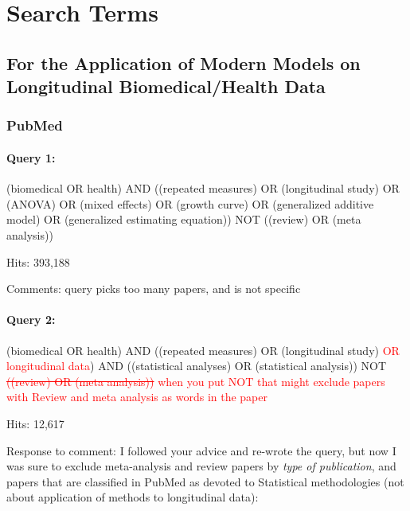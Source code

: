 \documentclass[
]{article}
\let\oldparagraph\paragraph
\renewcommand{\paragraph}[1]{\oldparagraph{#1}\mbox{}}
\newcommand{\BN}[1]{\textcolor{red}{#1}}
\begin{document}
\hypertarget{search-terms}{%
\section{Search Terms}\label{search-terms}}

\hypertarget{for-the-application-of-modern-models-on-longitudinal-biomedicalhealth-data}{%
\subsection{For the Application of Modern Models on Longitudinal
Biomedical/Health
Data}\label{for-the-application-of-modern-models-on-longitudinal-biomedicalhealth-data}}

\hypertarget{pubmed}{%
\subsubsection{PubMed}\label{pubmed}}

\hypertarget{query-1}{%
\paragraph{Query 1:}\label{query-1}}

(biomedical OR health) AND ((repeated measures) OR (longitudinal study)
OR (ANOVA) OR (mixed effects) OR (growth curve) OR (generalized additive
model) OR (generalized estimating equation)) NOT ((review) OR (meta
analysis))

Hits: 393,188

Comments: query picks too many papers, and is not specific

\hypertarget{query-2}{%
\paragraph{Query 2:}\label{query-2}}

(biomedical OR health) AND ((repeated measures) OR (longitudinal study)
\BN{OR longitudinal data}) AND ((statistical analyses) OR (statistical
analysis)) NOT \BN{\sout{((review) OR
(meta analysis))}}
\BN{when you put NOT that might exclude papers with Review and meta analysis as words in the paper}

Hits: 12,617

Response to comment: I followed your advice and re-wrote the query, but
now I was sure to exclude meta-analysis and review papers by \emph{type
of publication}, and papers that are classified in PubMed as devoted to
Statistical methodologies (not about application of methods to
longitudinal data):
\end{document}
